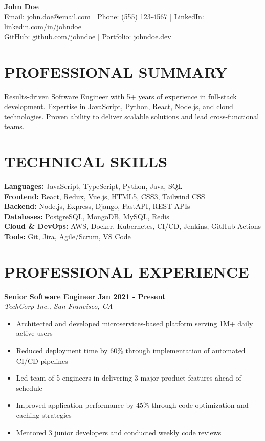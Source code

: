 \documentclass{article}
\begin{document}
\begin{center}
    {\LARGE \textbf{John Doe}} \\
    \vspace{0.1cm}
    Email: john.doe@email.com | Phone: (555) 123-4567 | LinkedIn: linkedin.com/in/johndoe \\
    GitHub: github.com/johndoe | Portfolio: johndoe.dev
\end{center}

\vspace{0.3cm}

\section*{PROFESSIONAL SUMMARY}
Results-driven Software Engineer with 5+ years of experience in full-stack development. Expertise in JavaScript, Python, React, Node.js, and cloud technologies. Proven ability to deliver scalable solutions and lead cross-functional teams.

\vspace{0.2cm}

\section*{TECHNICAL SKILLS}
\textbf{Languages:} JavaScript, TypeScript, Python, Java, SQL \\
\textbf{Frontend:} React, Redux, Vue.js, HTML5, CSS3, Tailwind CSS \\
\textbf{Backend:} Node.js, Express, Django, FastAPI, REST APIs \\
\textbf{Databases:} PostgreSQL, MongoDB, MySQL, Redis \\
\textbf{Cloud \& DevOps:} AWS, Docker, Kubernetes, CI/CD, Jenkins, GitHub Actions \\
\textbf{Tools:} Git, Jira, Agile/Scrum, VS Code

\vspace{0.2cm}

\section*{PROFESSIONAL EXPERIENCE}

\textbf{Senior Software Engineer} \hfill \textbf{Jan 2021 - Present} \\
\textit{TechCorp Inc., San Francisco, CA}
\begin{itemize}[leftmargin=*, itemsep=0pt]
    \item Architected and developed microservices-based platform serving 1M+ daily active users
    \item Reduced deployment time by 60\% through implementation of automated CI/CD pipelines
    \item Led team of 5 engineers in delivering 3 major product features ahead of schedule
    \item Improved application performance by 45\% through code optimization and caching strategies
    \item Mentored 3 junior developers and conducted weekly code reviews
\end{itemize}
\end{document}
